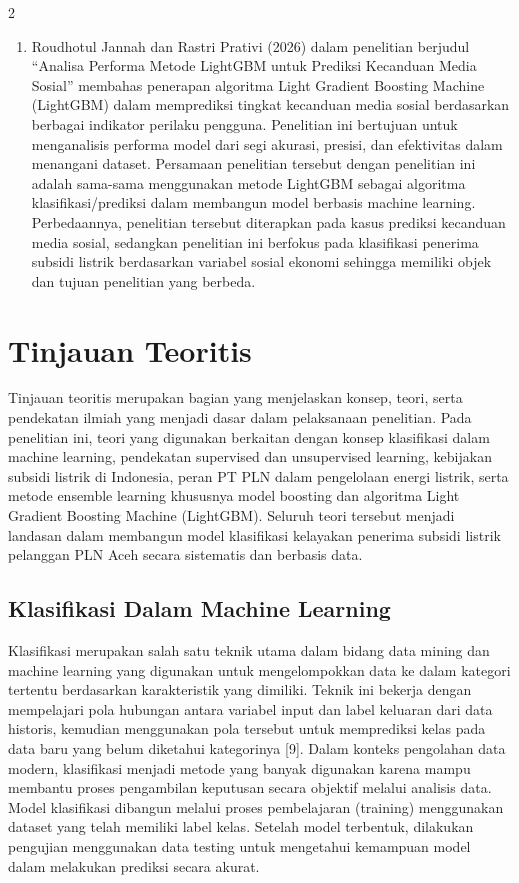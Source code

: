 \documentclass[12pt, a4paper, onecolumn, oneside]{report}
\begin{document}
\begin{spacing}{2}
\begin{enumerate}
    \item Roudhotul Jannah dan Rastri Prativi (2026) dalam penelitian berjudul ``Analisa Performa Metode LightGBM untuk Prediksi Kecanduan Media Sosial'' membahas penerapan algoritma Light Gradient Boosting Machine (LightGBM) dalam memprediksi tingkat kecanduan media sosial berdasarkan berbagai indikator perilaku pengguna. Penelitian ini bertujuan untuk menganalisis performa model dari segi akurasi, presisi, dan efektivitas dalam menangani dataset. Persamaan penelitian tersebut dengan penelitian ini adalah sama-sama menggunakan metode LightGBM sebagai algoritma klasifikasi/prediksi dalam membangun model berbasis machine learning. Perbedaannya, penelitian tersebut diterapkan pada kasus prediksi kecanduan media sosial, sedangkan penelitian ini berfokus pada klasifikasi penerima subsidi listrik berdasarkan variabel sosial ekonomi sehingga memiliki objek dan tujuan penelitian yang berbeda.
\end{enumerate}

\section{Tinjauan Teoritis}
Tinjauan teoritis merupakan bagian yang menjelaskan konsep, teori, serta pendekatan ilmiah yang menjadi dasar dalam pelaksanaan penelitian. Pada penelitian ini, teori yang digunakan berkaitan dengan konsep klasifikasi dalam machine learning, pendekatan supervised dan unsupervised learning, kebijakan subsidi listrik di Indonesia, peran PT PLN dalam pengelolaan energi listrik, serta metode ensemble learning khususnya model boosting dan algoritma Light Gradient Boosting Machine (LightGBM). Seluruh teori tersebut menjadi landasan dalam membangun model klasifikasi kelayakan penerima subsidi listrik pelanggan PLN Aceh secara sistematis dan berbasis data.

\subsection{Klasifikasi Dalam Machine Learning}
Klasifikasi merupakan salah satu teknik utama dalam bidang data mining dan machine learning yang digunakan untuk mengelompokkan data ke dalam kategori tertentu berdasarkan karakteristik yang dimiliki. Teknik ini bekerja dengan mempelajari pola hubungan antara variabel input dan label keluaran dari data historis, kemudian menggunakan pola tersebut untuk memprediksi kelas pada data baru yang belum diketahui kategorinya [9]. Dalam konteks pengolahan data modern, klasifikasi menjadi metode yang banyak digunakan karena mampu membantu proses pengambilan keputusan secara objektif melalui analisis data. Model klasifikasi dibangun melalui proses pembelajaran (training) menggunakan dataset yang telah memiliki label kelas. Setelah model terbentuk, dilakukan pengujian menggunakan data testing untuk mengetahui kemampuan model dalam melakukan prediksi secara akurat.


\end{spacing}
\end{document}
